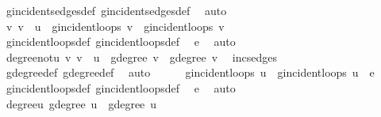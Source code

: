 \begin{isabellebody}
\ g{\isacharprime}{\kern0pt}{\isachardot}{\kern0pt}incident{\isacharunderscore}{\kern0pt}sedges{\isacharunderscore}{\kern0pt}def\ g{\isachardot}{\kern0pt}incident{\isacharunderscore}{\kern0pt}sedges{\isacharunderscore}{\kern0pt}def\ \isamarkupfalse%
\ auto\isanewline
\ \ \ \ \isamarkupfalse%
\ {\isachardoublequoteopen}{\isasymAnd}v{\isachardot}{\kern0pt}\ v\ {\isasymnoteq}\ u\ {\isasymLongrightarrow}\ g{\isacharprime}{\kern0pt}{\isachardot}{\kern0pt}incident{\isacharunderscore}{\kern0pt}loops\ v\ {\isacharequal}{\kern0pt}\ g{\isachardot}{\kern0pt}incident{\isacharunderscore}{\kern0pt}loops\ v{\isachardoublequoteclose}\ \isamarkupfalse%
\ g{\isacharprime}{\kern0pt}{\isachardot}{\kern0pt}incident{\isacharunderscore}{\kern0pt}loops{\isacharunderscore}{\kern0pt}def\ g{\isachardot}{\kern0pt}incident{\isacharunderscore}{\kern0pt}loops{\isacharunderscore}{\kern0pt}def\ \isamarkupfalse%
\ e\ \isamarkupfalse%
\ auto\isanewline
\ \ \ \ \isamarkupfalse%
\ \isamarkupfalse%
\ degree{\isacharunderscore}{\kern0pt}not{\isacharunderscore}{\kern0pt}u{\isacharcolon}{\kern0pt}\ {\isachardoublequoteopen}{\isasymAnd}v{\isachardot}{\kern0pt}\ v\ {\isasymnoteq}\ u\ {\isasymLongrightarrow}\ g{\isacharprime}{\kern0pt}{\isachardot}{\kern0pt}degree\ v\ {\isacharequal}{\kern0pt}\ g{\isachardot}{\kern0pt}degree\ v{\isachardoublequoteclose}\ \isamarkupfalse%
\ inc{\isacharunderscore}{\kern0pt}sedges\ \isamarkupfalse%
\ g{\isacharprime}{\kern0pt}{\isachardot}{\kern0pt}degree{\isacharunderscore}{\kern0pt}def\ g{\isachardot}{\kern0pt}degree{\isacharunderscore}{\kern0pt}def\ \isamarkupfalse%
\ auto\isanewline
\ \ \ \ \isamarkupfalse%
\ {\isachardoublequoteopen}g{\isacharprime}{\kern0pt}{\isachardot}{\kern0pt}incident{\isacharunderscore}{\kern0pt}loops\ u\ {\isacharequal}{\kern0pt}\ g{\isachardot}{\kern0pt}incident{\isacharunderscore}{\kern0pt}loops\ u\ {\isasymunion}\ {\isacharbraceleft}{\kern0pt}e{\isacharbraceright}{\kern0pt}{\isachardoublequoteclose}\ \isamarkupfalse%
\ g{\isacharprime}{\kern0pt}{\isachardot}{\kern0pt}incident{\isacharunderscore}{\kern0pt}loops{\isacharunderscore}{\kern0pt}def\ g{\isachardot}{\kern0pt}incident{\isacharunderscore}{\kern0pt}loops{\isacharunderscore}{\kern0pt}def\ \isamarkupfalse%
\ e\ \isamarkupfalse%
\ auto\isanewline
\ \ \ \ \isamarkupfalse%
\ \isamarkupfalse%
\ degree{\isacharunderscore}{\kern0pt}u{\isacharcolon}{\kern0pt}\ {\isachardoublequoteopen}g{\isacharprime}{\kern0pt}{\isachardot}{\kern0pt}degree\ u\ {\isacharequal}{\kern0pt}\ g{\isachardot}{\kern0pt}degree\ u\ {\isacharplus}{\kern0pt}\ {}{\isachardoublequoteclose}\ \isamarkupfalse%

\end{isabellebody}
